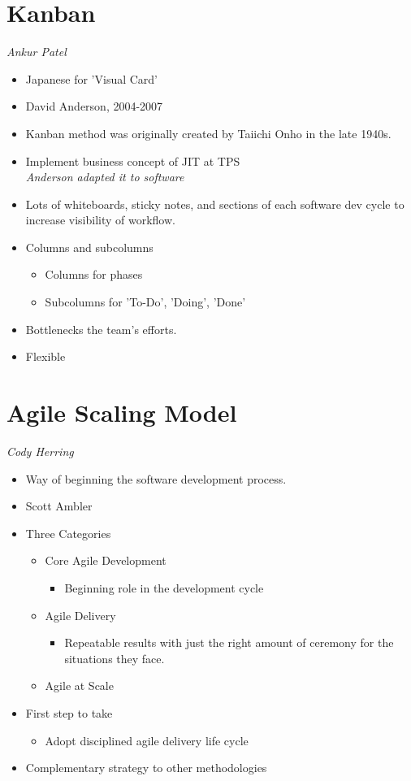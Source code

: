 \documentclass{report}
\begin{document}
		\section{Kanban}
			\textit{Ankur Patel}
			\begin{itemize}
				\item Japanese for 'Visual Card'
				\item David Anderson, 2004-2007
				\item Kanban method was originally created by Taiichi Onho in the late 1940s.
				\item Implement business concept of JIT at TPS\\
					\textit{Anderson adapted it to software}
				\item Lots of whiteboards, sticky notes, and sections of each software dev cycle to increase visibility of workflow.
				\item Columns and subcolumns
					\begin{itemize}
						\item Columns for phases
						\item Subcolumns for 'To-Do', 'Doing', 'Done'
					\end{itemize}
				\item Bottlenecks the team's efforts.
				\item Flexible
			\end{itemize}
		\section{Agile Scaling Model}
			\textit{Cody Herring}
			\begin{itemize}
				\item Way of beginning the software development process.
				\item Scott Ambler
				\item Three Categories
					\begin{itemize}
						\item Core Agile Development
							\begin{itemize}
								\item Beginning role in the development cycle
							\end{itemize}
						\item Agile Delivery
							\begin{itemize}
								\item Repeatable results with just the right amount of ceremony for the situations they face.
							\end{itemize}
						\item Agile at Scale
					\end{itemize}
				\item First step to take
					\begin{itemize}
						\item Adopt disciplined agile delivery life cycle
					\end{itemize}
				\item Complementary strategy to other methodologies
			\end{itemize}
\end{document}
